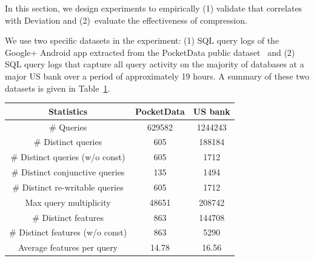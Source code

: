 In this section, we design experiments to empirically (1) validate that \errorname correlates with Deviation and (2)~evaluate the effectiveness of \systemname compression.

We use two specific datasets in the experiment: (1) SQL query logs of the Google+ Android app extracted from the PocketData public dataset~\cite{DBLP:conf/tpctc/KennedyACZ15} and (2) SQL query logs that capture all query activity on the majority of databases at a major US bank over a period of approximately 19 hours.
A summary of these two datasets is given in Table~\ref{table:datasummary}.

\begin{table}
\centering
{}
\label{table:datasummary}
{\small \centering
\begin{tabular}{c c c}
\toprule
Statistics & PocketData & US bank \\
\midrule
\# Queries & 629582& 1244243\\
\midrule
\# Distinct queries & 605& 188184\\
\midrule
\# Distinct queries (w/o const)& 605& 1712\\
\midrule
\# Distinct conjunctive queries & 135& 1494\\
\midrule
\# Distinct re-writable queries & 605& 1712\\
\midrule
Max query multiplicity & 48651 & 208742\\
\midrule
\# Distinct features & 863& 144708\\
\midrule
\# Distinct features (w/o const) & 863& 5290\\
\midrule
Average features per query & 14.78& 16.56\\
\bottomrule
\end{tabular}
}
\trimfigurewhitespace
\end{table}

